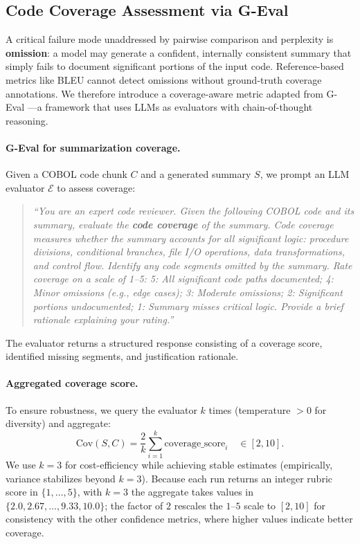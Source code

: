 \subsection{Code Coverage Assessment via G-Eval}
\label{sec:coverage}

A critical failure mode unaddressed by pairwise comparison and perplexity is
\textbf{omission}: a model may generate a confident, internally consistent summary that
simply fails to document significant portions of the input code. Reference-based metrics
like BLEU cannot detect omissions without ground-truth coverage annotations. We therefore
introduce a coverage-aware metric adapted from G-Eval \cite{liu2023geval}---a framework
that uses LLMs as evaluators with chain-of-thought reasoning.

\paragraph{G-Eval for summarization coverage.}
Given a COBOL code chunk $C$ and a generated summary $S$, we prompt an LLM evaluator
$\mathcal{E}$ to assess coverage:
\begin{quote}\itshape
``You are an expert code reviewer. Given the following COBOL code and its summary, evaluate
the \textbf{code coverage} of the summary. Code coverage measures whether the summary
accounts for all significant logic: procedure divisions, conditional branches, file I/O
operations, data transformations, and control flow. Identify any code segments omitted by
the summary. Rate coverage on a scale of 1--5:
5: All significant code paths documented;
4: Minor omissions (e.g., edge cases);
3: Moderate omissions;
2: Significant portions undocumented;
1: Summary misses critical logic.
Provide a brief rationale explaining your rating.''
\end{quote}
The evaluator returns a structured response consisting of a coverage score, identified
missing segments, and justification rationale.

\paragraph{Aggregated coverage score.}
To ensure robustness, we query the evaluator $k$ times (temperature $>0$ for diversity)
and aggregate:
\begin{equation}
\mathrm{Cov}(S,C) = \frac{2}{k}\sum_{i=1}^{k}\mathrm{coverage\_score}_i \quad \in [2,10].
\label{eq:cov}
\end{equation}
We use $k=3$ for cost-efficiency while achieving stable estimates (empirically, variance
stabilizes beyond $k=3$). Because each run returns an integer rubric score in
$\{1,\dots,5\}$, with $k=3$ the aggregate takes values in
$\{2.0, 2.67, \dots, 9.33, 10.0\}$; the factor of $2$ rescales the $1$--$5$ scale to
$[2,10]$ for consistency with the other confidence metrics, where higher values indicate
better coverage.

